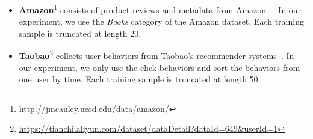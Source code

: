 \begin{itemize}
    \item \textbf{Amazon}\footnote{\url{http://jmcauley.ucsd.edu/data/amazon/}} consists of product reviews and metadata from Amazon ~\cite{mcauley2015image,he2016ups}. In our experiment, we use the \textit{Books} category of the Amazon dataset. Each training sample is truncated at length 20.
    \item \textbf{Taobao}\footnote{\url{https://tianchi.aliyun.com/dataset/dataDetail?dataId=649\&userId=1}} collects user behaviors from Taobao's recommender systems~\cite{zhu2018learning}.  In our experiment, we only use the click behaviors and sort the behaviors from one user by time. Each training sample is truncated at length 50.
\end{itemize}

